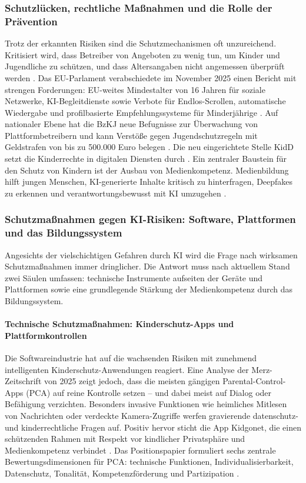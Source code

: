 \documentclass[12pt,a4paper]{article}
\begin{document}
	\subsubsection{Schutzlücken, rechtliche Maßnahmen und die Rolle der Prävention}
	
	Trotz der erkannten Risiken sind die Schutzmechanismen oft unzureichend. Kritisiert wird, dass Betreiber von Angeboten zu wenig tun, um Kinder und Jugendliche zu schützen, und dass Altersangaben nicht angemessen überprüft werden \cite{BzKJ2025b}. Das EU-Parlament verabschiedete im November 2025 einen Bericht mit strengen Forderungen: EU-weites Mindestalter von 16 Jahren für soziale Netzwerke, KI-Begleitdienste sowie Verbote für Endlos-Scrollen, automatische Wiedergabe und profilbasierte Empfehlungssysteme für Minderjährige \cite{EUParliament2025}. Auf nationaler Ebene hat die BzKJ neue Befugnisse zur Überwachung von Plattformbetreibern und kann Verstöße gegen Jugendschutzregeln mit Geldstrafen von bis zu 500.000 Euro belegen \cite{BzKJ2025a}. Die neu eingerichtete Stelle KidD setzt die Kinderrechte in digitalen Diensten durch \cite{KidD2025}. Ein zentraler Baustein für den Schutz von Kindern ist der Ausbau von Medienkompetenz. Medienbildung hilft jungen Menschen, KI-generierte Inhalte kritisch zu hinterfragen, Deepfakes zu erkennen und verantwortungsbewusst mit KI umzugehen \cite{LMK2025}.
	
	\subsubsection{Schutzmaßnahmen gegen KI-Risiken: Software, Plattformen und das Bildungssystem}
	
	Angesichts der vielschichtigen Gefahren durch KI wird die Frage nach wirksamen Schutzmaßnahmen immer dringlicher. Die Antwort muss nach aktuellem Stand zwei Säulen umfassen: technische Instrumente aufseiten der Geräte und Plattformen sowie eine grundlegende Stärkung der Medienkompetenz durch das Bildungssystem.
	
	\paragraph{Technische Schutzmaßnahmen: Kinderschutz-Apps und Plattformkontrollen}
	Die Softwareindustrie hat auf die wachsenden Risiken mit zunehmend intelligenten Kinderschutz-Anwendungen reagiert. Eine Analyse der Merz-Zeitschrift von 2025 zeigt jedoch, dass die meisten gängigen Parental-Control-Apps (PCA) auf reine Kontrolle setzen – und dabei meist auf Dialog oder Befähigung verzichten. Besonders invasive Funktionen wie heimliches Mitlesen von Nachrichten oder verdeckte Kamera-Zugriffe werfen gravierende datenschutz- und kinderrechtliche Fragen auf. Positiv hervor sticht die App Kidgonet, die einen schützenden Rahmen mit Respekt vor kindlicher Privatsphäre und Medienkompetenz verbindet \cite{Kidgonet2025}. Das Positionspapier formuliert sechs zentrale Bewertungsdimensionen für PCA: technische Funktionen, Individualisierbarkeit, Datenschutz, Tonalität, Kompetenzförderung und Partizipation \cite{Merz2025}.
	
\end{document}
